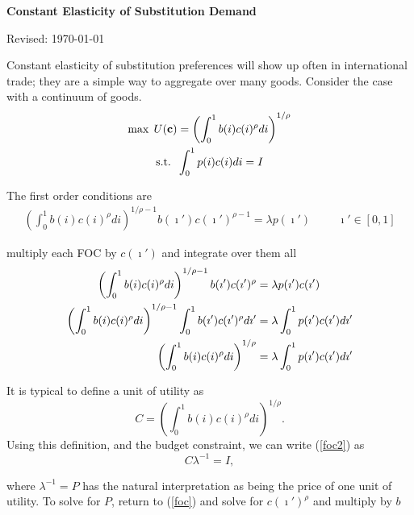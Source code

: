 \documentclass[11pt, pdftex]{article}
\newcommand{\lam}{\lambda}
\begin{document}
\bigskip
\centerline{\large \bf Constant Elasticity of Substitution Demand}
\centerline{Revised: \today}


\bigskip
\onehalfspacing
Constant elasticity of substitution preferences will show up often in international trade; they are a simple way to aggregate over many goods. Consider the case with a continuum of goods.
\begin{align}
\max \; U(\mathbf{c})&=\left(\int_0^1b(i)c(i)^\rho di \right)^{1/\rho} \label{ces} \\
\text{s.t.}\;\;&\int_0^1p(i)c(i) di =I \notag
\end{align}

The first order conditions are
\begin{align}
\label{foc}
\left(\int_0^1b(i)c(i)^\rho di \right)^{1/\rho-1}b(\imath ')c(\imath ')^{\rho-1}=\lam p(\imath ') \hspace{1cm} \imath ' \in[0,1]
\end{align}

multiply each FOC by $c(\imath ')$ and integrate over them all
\begin{align}
\left(\int_0^1b(i)c(i)^\rho di \right)^{1/\rho-1}b(\imath ')c(\imath ')^{\rho}&=\lam p(\imath ')c(\imath ') \notag \\
\left(\int_0^1b(i)c(i)^\rho di \right)^{1/\rho-1} \int_0^1b(\imath ')c(\imath ')^{\rho}d\imath '&=\lam\int_0^1 p(\imath ')c(\imath ')d\imath '\notag \\
\left(\int_0^1b(i)c(i)^\rho di \right)^{1/\rho}&=\lam\int_0^1 p(\imath ')c(\imath ')d\imath ' \label{foc2}
\end{align}

It is typical to define a unit of utility as
\begin{equation}
C=\left(\int_0^1b(i)c(i)^\rho di \right)^{1/\rho}.
\end{equation}
Using this definition, and the budget constraint, we can write (\ref{foc2}) as
\begin{equation}
C \lambda^{-1}=I,
\end{equation}

where $\lam^{-1}=P$ has the natural interpretation as being the price of one unit of utility.  To solve for $P$, return to (\ref{foc}) and solve for $c(\imath ')^\rho$ and multiply by $b$
\end{document}
